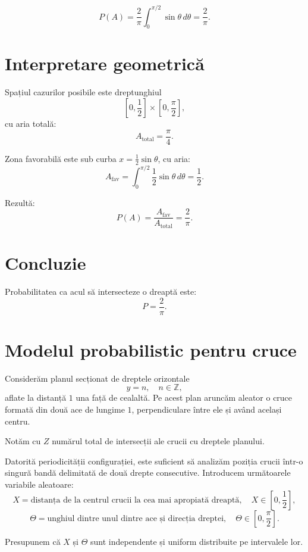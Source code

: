 \documentclass[12pt]{article}
\begin{document}
\[
P(A) = \frac{2}{\pi} \int_0^{\pi/2} \sin\theta\,d\theta
= \frac{2}{\pi}.
\]

\section{Interpretare geometrică}

Spațiul cazurilor posibile este dreptunghiul
\[
\left[0,\frac{1}{2}\right]\times\left[0,\frac{\pi}{2}\right],
\]
cu aria totală:
\[
A_{\text{total}} = \frac{\pi}{4}.
\]

Zona favorabilă este sub curba $x=\frac{1}{2}\sin\theta$, cu aria:
\[
A_{\text{fav}} = \int_0^{\pi/2} \frac{1}{2}\sin\theta\,d\theta = \frac{1}{2}.
\]

Rezultă:
\[
P(A) = \frac{A_{\text{fav}}}{A_{\text{total}}}
= \frac{2}{\pi}.
\]

\section{Concluzie}

Probabilitatea ca acul să intersecteze o dreaptă este:
\[
\boxed{P = \frac{2}{\pi}}.
\]

\newpage

\par

\section{Modelul probabilistic pentru cruce}

Considerăm planul secționat de dreptele orizontale
\[
y = n, \quad n \in \mathbb{Z},
\]
aflate la distanță $1$ una față de cealaltă. Pe acest plan aruncăm aleator o cruce formată din două ace de lungime $1$, perpendiculare între ele și având același centru.

Notăm cu $Z$ numărul total de intersecții ale crucii cu dreptele planului.

Datorită periodicității configurației, este suficient să analizăm poziția crucii într-o singură bandă delimitată de două drepte consecutive. Introducem următoarele variabile aleatoare:
\[
X = \text{distanța de la centrul crucii la cea mai apropiată dreaptă}, 
\quad X \in \left[0,\frac{1}{2}\right],
\]
\[
\Theta = \text{unghiul dintre unul dintre ace și direcția dreptei}, 
\quad \Theta \in \left[0,\frac{\pi}{2}\right].
\]

Presupunem că $X$ și $\Theta$ sunt independente și uniform distribuite pe intervalele lor.
\end{document}
